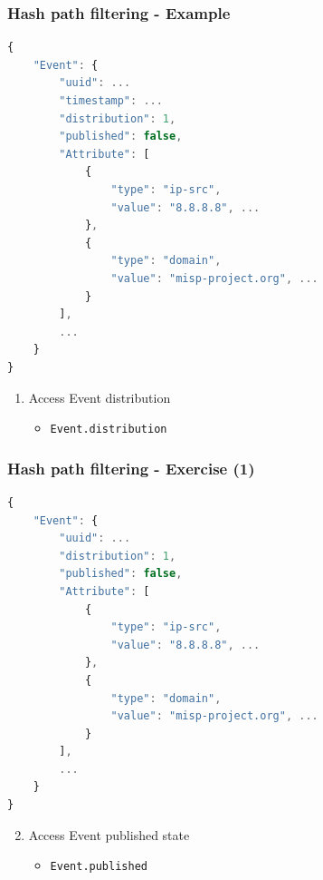 \begin{frame}[fragile]
    \frametitle{Hash path filtering - Example}

\begin{lstlisting}[language=javascript,firstnumber=1]
{
    "Event": {
        "uuid": ...
        "timestamp": ...
        "distribution": 1,
        "published": false,
        "Attribute": [
            {
                "type": "ip-src",
                "value": "8.8.8.8", ...
            },
            {
                "type": "domain",
                "value": "misp-project.org", ...
            }
        ],
        ...
    }
}
\end{lstlisting}
    \begin{enumerate}
        \item Access Event distribution
        \begin{itemize}
            \item \texttt{Event.distribution}
        \end{itemize}
    \end{enumerate}
\end{frame}

\begin{frame}[fragile]
    \frametitle{Hash path filtering - Exercise (1)}

\begin{lstlisting}[language=javascript,firstnumber=1]
{
    "Event": {
        "uuid": ...
        "distribution": 1,
        "published": false,
        "Attribute": [
            {
                "type": "ip-src",
                "value": "8.8.8.8", ...
            },
            {
                "type": "domain",
                "value": "misp-project.org", ...
            }
        ],
        ...
    }
}
\end{lstlisting}
    \begin{enumerate}
        \setcounter{enumi}{1}
        \item Access Event published state
        \pause
        \begin{itemize}
            \item \texttt{Event.published}
        \end{itemize}
    \end{enumerate}
\end{frame}

